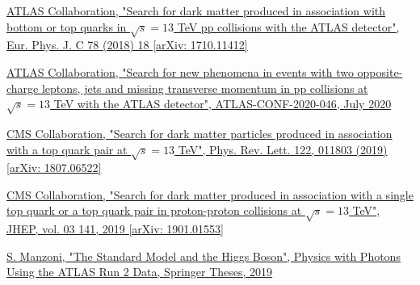 \documentclass[a4paper, 10pt, openright]{report}
\begin{document}
\begin{thebibliography}{1}


\href{https://arxiv.org/abs/1710.11412}{ATLAS Collaboration,
"Search for dark matter produced in association with bottom or top quarks in $\sqrt{s} = 13$ TeV pp collisions with the ATLAS detector",
Eur. Phys. J. C 78 (2018) 18 [arXiv: 1710.11412]}

\href{https://atlas.web.cern.ch/Atlas/GROUPS/PHYSICS/CONFNOTES/ATLAS-CONF-2020-046/ATLAS-CONF-2020-046.pdf}{ATLAS Collaboration,
"Search for new phenomena in events with two opposite-charge leptons, jets and missing transverse momentum in pp collisions at $\sqrt{s} = 13$ TeV with the ATLAS detector",
ATLAS-CONF-2020-046, July 2020}


\href{https://arxiv.org/abs/1807.06522}{CMS Collaboration,
"Search for dark matter particles produced in association with a top quark pair at $\sqrt{s} = 13$ TeV",
Phys. Rev. Lett. 122, 011803 (2019) [arXiv: 1807.06522]}

\href{https://arxiv.org/abs/1901.01553}{CMS Collaboration,
"Search for dark matter produced in association with a single top quark or a top quark pair in proton-proton collisions at $\sqrt{s} = 13$ TeV",
JHEP, vol. 03 141, 2019 [arXiv: 1901.01553]}

\href{https://link.springer.com/chapter/10.1007/978-3-030-24370-8_2#citeas}{S. Manzoni, 
"The Standard Model and the Higgs Boson",
Physics with Photons Using the ATLAS Run 2 Data, Springer Theses, 2019
}


\end{thebibliography}
\end{document}
